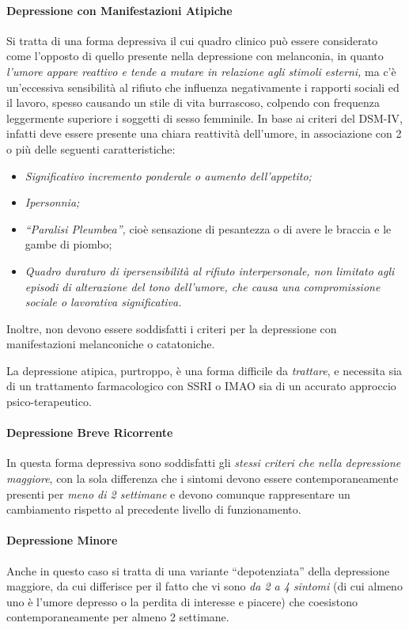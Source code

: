 \paragraph{Depressione con Manifestazioni Atipiche}
Si tratta di
  una forma depressiva il cui quadro clinico può essere considerato come
  l'opposto di quello presente nella depressione con melanconia, in
  quanto \emph{l'umore appare reattivo e tende a mutare in relazione
  agli stimoli esterni,} ma c'è un'eccessiva sensibilità al rifiuto che
  influenza negativamente i rapporti sociali ed il lavoro, spesso
  causando un stile di vita burrascoso, colpendo con frequenza
  leggermente superiore i soggetti di sesso femminile. In base ai
  criteri del DSM-IV, infatti deve essere presente una chiara reattività
  dell'umore, in associazione con 2 o più delle seguenti
  caratteristiche:

\begin{itemize}
\item
  \emph{Significativo incremento ponderale o aumento dell'appetito;}
\item
  \emph{Ipersonnia;}
\item
  \emph{``Paralisi Pleumbea'',} cioè sensazione di pesantezza o di avere
  le braccia e le gambe di piombo;
\item
  \emph{Quadro duraturo di ipersensibilità al rifiuto interpersonale,
  non limitato agli episodi di alterazione del tono dell'umore, che
  causa una compromissione sociale o lavorativa significativa.}
\end{itemize}

Inoltre, non devono essere soddisfatti i criteri per la depressione con
manifestazioni melanconiche o catatoniche.

La depressione atipica, purtroppo, è una forma difficile da
\emph{trattare}, e necessita sia di un trattamento farmacologico con
SSRI o IMAO sia di un accurato approccio psico-terapeutico.

\paragraph{Depressione Breve Ricorrente}
In questa forma
  depressiva sono soddisfatti gli \emph{stessi criteri che nella
  depressione maggiore}, con la sola differenza che i sintomi devono
  essere contemporaneamente presenti per \emph{meno di 2 settimane} e
  devono comunque rappresentare un cambiamento rispetto al precedente
  livello di funzionamento.

\paragraph{Depressione Minore}
Anche in questo caso si tratta di
  una variante ``depotenziata'' della depressione maggiore, da cui
  differisce per il fatto che vi sono \emph{da 2 a 4 sintomi} (di cui
  almeno uno è l'umore depresso o la perdita di interesse e piacere) che
  coesistono contemporaneamente per almeno 2 settimane.


